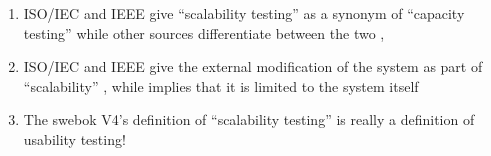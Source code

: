 \begin{enumerate}
      \item %
            \ifnotpaper \citeauthor{IEEE2021} \else ISO/IEC and IEEE \fi give
            ``scalability testing'' as a synonym of ``capacity testing''
            \ifnotpaper \citeyearpar[p.~39]{IEEE2021} \else \cite[p.~39]{IEEE2021}
            \fi while other sources differentiate between the two
            \ifnotpaper \citetext{\citealp[p.~53]{Firesmith2015};
                        \citealp[pp.~22-23]{Bas2024}}
            \else \citep[p.~53]{Firesmith2015}, \citep[pp.~22-23]{Bas2024}
            \fi
      \item %
            \ifnotpaper \citeauthor{IEEE2021} \else ISO/IEC and IEEE \fi give
            the external modification of the system as part of ``scalability''
            \ifnotpaper \citeyearpar[p.~39]{IEEE2021}\else
                  \cite[p.~39]{IEEE2021}\fi, while \ifnotpaper \citeauthor{ISO_IEC2023a}
            \else \cite{ISO_IEC2023a} \fi implies that it is limited to the
            system itself \ifnotpaper \citeyearpar{ISO_IEC2023a} \fi
      \item %
            The \acs{swebok} V4's definition of ``scalability testing''
            \citep[p.~5-9]{SWEBOK2024} is really a definition of usability
            testing!
\end{enumerate}



